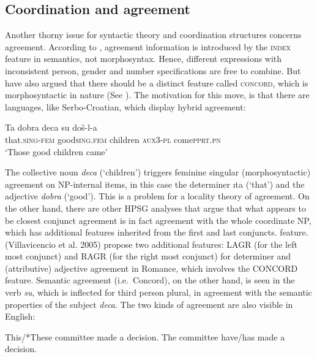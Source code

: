 \documentclass[output=paper]{langsci/langscibook}
\begin{document}
\subsection{Coordination and agreement}


Another thorny issue for syntactic theory and coordination structures concerns agreement. According to 
\citet{pollardsag}, agreement information is introduced by the \textsc{index} feature in semantics, not morphosyntax. Hence, different expressions
with inconsistent person, gender and number specifications are free to combine. But \citet{wechsler} have also argued that there should be a distinct feature called \textsc{concord}, which is morphosyntactic in nature (See ). The motivation for this move, is that there are languages, like Serbo-Croatian,
which display hybrid agreement:

\begin{exe}
\ex \gll Ta dobra deca su do\v{s}-l-a\\
         that.\textsc{sing-fem} good\textsc{sing.fem} children \textsc{aux}\textsc{3-pl} come\textsc{pprt.pn}\\
  \glt `Those good children came'   \\
  \citep[51]{wechsler} 
\end{exe}

\noindent
The collective noun \emph{deca} (`children') triggers feminine singular (morphosyntactic) agreement on NP-internal items, in this case the determiner {\i ta} (`that') and the adjective \emph{dobra} (`good').   This is a problem for a locality theory of agreement. On the other hand, there are other HPSG analyses that argue that what appears to be closest conjunct agreement is in fact agreement with the whole coordinate NP, which has additional features inherited from the first and last conjuncts. feature. (Villavicencio et al. 2005) propose two additional features: LAGR (for the left most conjunct) and RAGR (for the right most conjunct) for determiner and (attributive) adjective agreement in Romance, which involves the CONCORD feature.
Semantic agreement (i.e.\ Concord), on the other hand, is seen in the verb \emph{su}, which  is inflected for third person plural, in agreement with the semantic properties of the subject \emph{deca}. The two kinds of agreement are also visible in
English:

\begin{exe}
\ex
\begin{xlista}
\ex This/*These committee made a decision.
\ex The committee have/has made a decision.
\end{xlista}
\end{exe}
\end{document}
